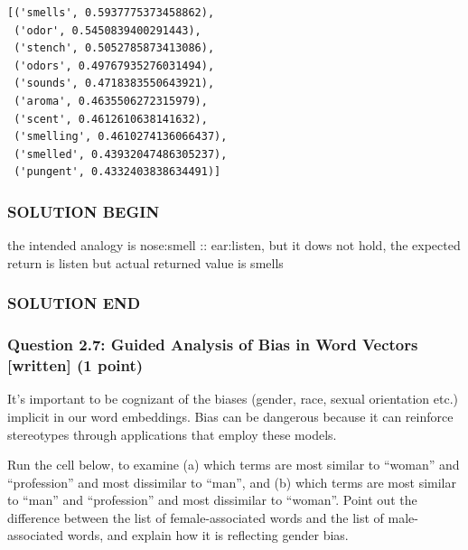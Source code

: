 \documentclass[11pt]{article}
\begin{document}
    \begin{Verbatim}[commandchars=\\\{\}]
[('smells', 0.5937775373458862),
 ('odor', 0.5450839400291443),
 ('stench', 0.5052785873413086),
 ('odors', 0.49767935276031494),
 ('sounds', 0.4718383550643921),
 ('aroma', 0.4635506272315979),
 ('scent', 0.4612610638141632),
 ('smelling', 0.4610274136066437),
 ('smelled', 0.43932047486305237),
 ('pungent', 0.4332403838634491)]
    \end{Verbatim}

    \subsubsection{SOLUTION BEGIN}\label{solution-begin}

the intended analogy is nose:smell :: ear:listen, but it dows not hold,
the expected return is listen but actual returned value is smells

\subsubsection{SOLUTION END}\label{solution-end}

    \subsubsection{Question 2.7: Guided Analysis of Bias in Word Vectors
{[}written{]} (1
point)}\label{question-2.7-guided-analysis-of-bias-in-word-vectors-written-1-point}

It's important to be cognizant of the biases (gender, race, sexual
orientation etc.) implicit in our word embeddings. Bias can be dangerous
because it can reinforce stereotypes through applications that employ
these models.

Run the cell below, to examine (a) which terms are most similar to
``woman'' and ``profession'' and most dissimilar to ``man'', and (b)
which terms are most similar to ``man'' and ``profession'' and most
dissimilar to ``woman''. Point out the difference between the list of
female-associated words and the list of male-associated words, and
explain how it is reflecting gender bias.
\end{document}
